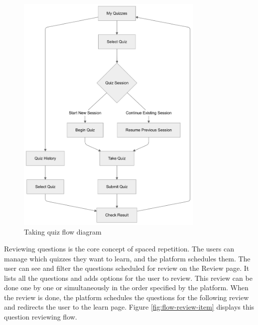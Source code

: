 \begin{figure}[H]
    \centering
    \includegraphics[width=0.8\textwidth, keepaspectratio]{figures/flow-taking-quiz.png}
    \caption{Taking quiz flow diagram}
    \label{fig:flow-taking-quiz}
\end{figure}

Reviewing questions is the core concept of spaced repetition. The users can manage which quizzes they want to learn, and the platform schedules them. The user can see and filter the questions scheduled for review on the Review page. It lists all the questions and adds options for the user to review. This review can be done one by one or simultaneously in the order specified by the platform. When the review is done, the platform schedules the questions for the following review and redirects the user to the learn page. Figure \ref{fig:flow-review-item} displays this question reviewing flow.

